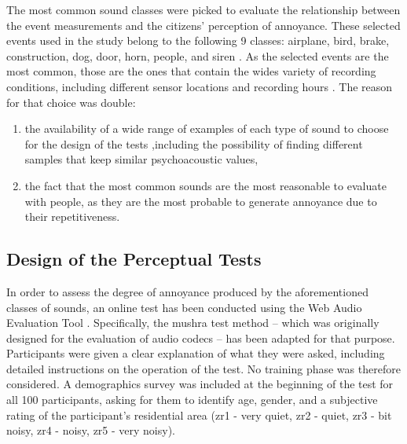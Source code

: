 The most common sound classes were picked to evaluate the relationship between the event measurements and the citizens' perception of annoyance. These selected events used in the study belong to the following 9 classes: airplane, bird, brake, construction, dog, door, horn, people, and siren . As the selected events are the most common, those are the ones that contain the wides variety of recording conditions, including different sensor locations and recording hours . The reason for that choice was double:

\begin{enumerate}
  \item the availability of a wide range of examples of each type of sound to choose for the design of the tests ,including the possibility of finding different samples that keep similar psychoacoustic values,
  \item the fact that the most common sounds are the most reasonable to evaluate with people, as they are the most probable to generate annoyance due to their repetitiveness.
\end{enumerate}

\subsection{Design of the Perceptual Tests}
\label{sec:DYNAMAPTests}
In order to assess the degree of annoyance produced by the aforementioned classes of sounds, an online test has been conducted using the Web Audio Evaluation Tool . Specifically, the \gls{mushra} test method  -- which was originally designed for the evaluation of audio codecs -- has been adapted for that purpose. Participants were given a clear explanation of what they were asked, including detailed instructions on the operation of the test. No training phase was therefore considered. A demographics survey was included at the beginning of the test for all 100 participants, asking for them to identify age, gender, and a subjective rating of the participant's residential area (zr1 - very quiet, zr2 - quiet, zr3 - bit noisy, zr4 - noisy, zr5 - very noisy).


